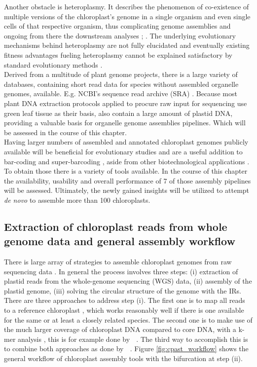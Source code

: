 Another obstacle is heteroplasmy. It describes the phenomenon of co-existence of multiple versions of the
chloroplast's genome in a single organism and even single cells of that respective organism, thus complicating
genome assemblies and ongoing from there the downstream analyses \cite{corriveau_1988}; \cite{Chat2002}. The
underlying evolutionary mechanisms behind heteroplasmy are not fully elucidated and eventually existing
fitness advantages fueling heteroplasmy cannot be explained satisfactory by standard evolutionary methods
\cite{Scar2016}. \\

Derived from a multitude of plant genome projects, there is a large variety of databases, containing short
read data for species without assembled organelle genomes, available. E.g. NCBI's sequence read archive (SRA)
\cite{SRA2010}. Because most plant DNA extraction protocols applied to procure raw input for sequencing use
green leaf tissue as their basis, also contain a large amount of plastid DNA, providing a valuable basis for
organelle genome assemblies pipelines. Which will be assessed in the course of this chapter.\\
Having larger numbers of assembled and annotated chloroplast genomes publicly available will be beneficial for
evolutionary studies and are a useful addition to bar-coding and super-barcoding \cite{coissac_barcodes_2016},
aside from other biotechnological applications \cite{daniell_chloroplast_2016}. To obtain those there is a
variety of tools available. In the course of this chapter the availability, usability and overall performance
of 7 of those assembly pipelines will be assessed. Ultimately, the newly gained insights will be utilized to
attempt \textit{de novo} to assemble more than 100 chloroplasts.

\subsection{Extraction of chloroplast reads from whole genome data and general assembly workflow}
There is large array of strategies to assemble chloroplast genomes from raw sequencing data
\cite{twyford_strategies_2017}. In general the process involves three steps: (i) extraction of plastid reads
from the whole-genome sequencing (WGS) data, (ii) assembly of the plastid genome, (iii) solving the circular
structure of the genome with the IRs. There are three approaches to address step (i). The first one is to map
all reads to a reference chloroplast \cite{Vinga2012}, which works reasonably well if there is one
available for the same or at least a closely related species. The second one is to make use of the much larger
coverage of chloroplast DNA compared to core DNA, with a k-mer analysis \cite{Chan2013}, this is for example
done by \ce $\;$ \cite{j_ankenbrand_chloroextractor:_2018}. The third way to accomplish this is to combine
both approaches as done by \np $\;$ \cite{dierckxsens_novoplasty:_2017}. Figure \ref{fig:cpast_workflow}
shows the general workflow of chloroplast assembly tools with the bifurcation at step (ii).

